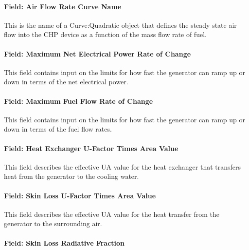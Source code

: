 \paragraph{Field: Air Flow Rate Curve Name}\label{field-air-flow-rate-curve-name}

This is the name of a Curve:Quadratic object that defines the steady state air flow into the CHP device as a function of the mass flow rate of fuel.

\paragraph{Field: Maximum Net Electrical Power Rate of Change}\label{field-maximum-net-electrical-power-rate-of-change}

This field contains input on the limits for how fast the generator can ramp up or down in terms of the net electrical power.

\paragraph{Field: Maximum Fuel Flow Rate of Change}\label{field-maximum-fuel-flow-rate-of-change}

This field contains input on the limits for how fast the generator can ramp up or down in terms of the fuel flow rates.

\paragraph{Field: Heat Exchanger U-Factor Times Area Value}\label{field-heat-exchanger-u-factor-times-area-value-000}

This field describes the effective UA value for the heat exchanger that transfers heat from the generator to the cooling water.

\paragraph{Field: Skin Loss U-Factor Times Area Value}\label{field-skin-loss-u-factor-times-area-value}

This field describes the effective UA value for the heat transfer from the generator to the surrounding air.

\paragraph{Field: Skin Loss Radiative Fraction}\label{field-skin-loss-radiative-fraction}

